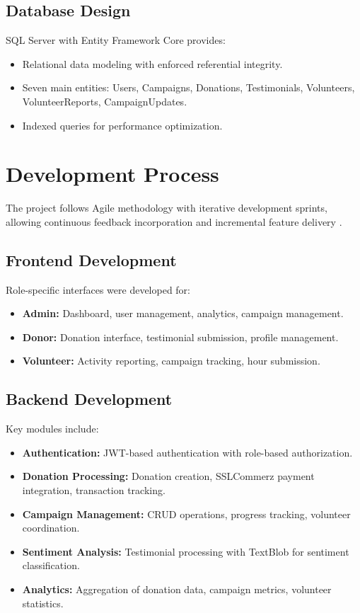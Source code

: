 \subsection{Database Design}
SQL Server with Entity Framework Core provides:
\begin{itemize}
    \item Relational data modeling with enforced referential integrity.
    \item Seven main entities: Users, Campaigns, Donations, Testimonials, Volunteers, VolunteerReports, CampaignUpdates.
    \item Indexed queries for performance optimization.
\end{itemize}

\section{Development Process}

The project follows Agile methodology with iterative development sprints, allowing continuous feedback incorporation and incremental feature delivery \cite{beck2001agile}.

\subsection{Frontend Development}
Role-specific interfaces were developed for:
\begin{itemize}
    \item \textbf{Admin:} Dashboard, user management, analytics, campaign management.
    \item \textbf{Donor:} Donation interface, testimonial submission, profile management.
    \item \textbf{Volunteer:} Activity reporting, campaign tracking, hour submission.
    
\end{itemize}

\subsection{Backend Development}
Key modules include:
\begin{itemize}
    \item \textbf{Authentication:} JWT-based authentication with role-based authorization.
    \item \textbf{Donation Processing:} Donation creation, SSLCommerz payment integration, transaction tracking.
    \item \textbf{Campaign Management:} CRUD operations, progress tracking, volunteer coordination.
    \item \textbf{Sentiment Analysis:} Testimonial processing with TextBlob for sentiment classification.
    \item \textbf{Analytics:} Aggregation of donation data, campaign metrics, volunteer statistics.
\end{itemize}

